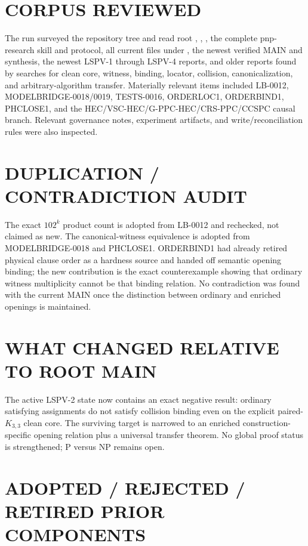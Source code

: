 \documentclass[11pt]{article}
\begin{document}
\section*{CORPUS REVIEWED}

The run surveyed the repository tree and read root ,
, , the complete pnp-research skill and protocol,
all current files under , the newest verified MAIN and synthesis,
the newest LSPV-1 through LSPV-4 reports, and older reports found by searches
for clean core, witness, binding, locator, collision, canonicalization, and
arbitrary-algorithm transfer.  Materially relevant items included LB-0012,
MODELBRIDGE-0018/0019, TESTS-0016, ORDERLOC1, ORDERBIND1, PHCLOSE1, and the
HEC/VSC-HEC/G-PPC-HEC/CRS-PPC/CCSPC causal branch.  Relevant governance notes,
experiment artifacts, and write/reconciliation rules were also inspected.

\section*{DUPLICATION / CONTRADICTION AUDIT}

The exact $102^k$ product count is adopted from LB-0012 and rechecked, not
claimed as new.  The canonical-witness equivalence is adopted from
MODELBRIDGE-0018 and PHCLOSE1.  ORDERBIND1 had already retired physical clause
order as a hardness source and handed off semantic opening binding; the new
contribution is the exact counterexample showing that ordinary witness
multiplicity cannot be that binding relation.  No contradiction was found
with the current MAIN once the distinction between ordinary and enriched
openings is maintained.

\section*{WHAT CHANGED RELATIVE TO ROOT MAIN}

The active LSPV-2 state now contains an exact negative result:
ordinary satisfying assignments do not satisfy collision binding even on the
explicit paired-$K_{3,3}$ clean core.  The surviving target is narrowed to an
enriched construction-specific opening relation plus a universal transfer
theorem.  No global proof status is strengthened; P versus NP remains open.

\section*{ADOPTED / REJECTED / RETIRED PRIOR COMPONENTS}
\end{document}
